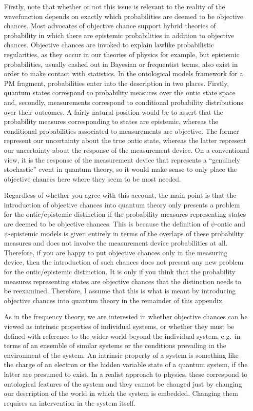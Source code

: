 \documentclass[DIV=calc,paper=a4,fontsize=11pt,twocolumn]{scrartcl} %
\theoremstyle{definition}
\theoremstyle{plain}
\begin{document}
Firstly, note that whether or not this issue is relevant to the
reality of the wavefunction depends on exactly which probabilities are
deemed to be objective chances.  Most advocates of objective chance
support hybrid theories of probability in which there are epistemic
probabilities in addition to objective chances.  Objective chances are
invoked to explain lawlike probabilistic regularities, as they occur
in our theories of physics for example, but epistemic probabilities,
usually cashed out in Bayesian or frequentist terms, also exist in
order to make contact with statistics.  In the ontological models
framework for a PM fragment, probabilities enter into the description
in two places.  Firstly, quantum states correspond to probability
measures over the ontic state space and, secondly, measurements
correspond to conditional probability distributions over their
outcomes.  A fairly natural position would be to assert that the
probability measures corresponding to states are epistemic, whereas
the conditional probabilities associated to measurements are
objective.  The former represent our uncertainty about the true ontic
state, whereas the latter represent our uncertainty about the response
of the measurement device.  On a conventional view, it is the response
of the measurement device that represents a ``genuinely stochastic''
event in quantum theory, so it would make sense to only place the
objective chances here where they seem to be most needed.

Regardless of whether you agree with this account, the main point is
that the introduction of objective chances into quantum theory only
presents a problem for the ontic/epistemic distinction if the
probability measures representing states are deemed to be objective
chances.  This is because the definition of $\psi$-ontic and
$\psi$-epistemic models is given entirely in terms of the overlaps of
these probability measures and does not involve the measurement device
probabilities at all.  Therefore, if you are happy to put objective
chances only in the measuring device, then the introduction of such
chances does not present any new problem for the ontic/epistemic
distinction.  It is only if you think that the probability measures
representing states are objective chances that the distinction needs
to be reexamined.  Therefore, I assume that this is what is meant by
introducing objective chances into quantum theory in the remainder of
this appendix.

As in the frequency theory, we are interested in whether objective
chances can be viewed as intrinsic properties of individual systems,
or whether they must be defined with reference to the wider world
beyond the individual system, e.g.\ in terms of an ensemble of similar
systems or the conditions prevailing in the environment of the system.
An intrinsic property of a system is something like the charge of an
electron or the hidden variable state of a quantum system, if the
latter are presumed to exist.  In a realist approach to physics, these
correspond to ontological features of the system and they cannot be
changed just by changing our description of the world in which the
system is embedded.  Changing them requires an intervention in the
system itself.
\end{document}
